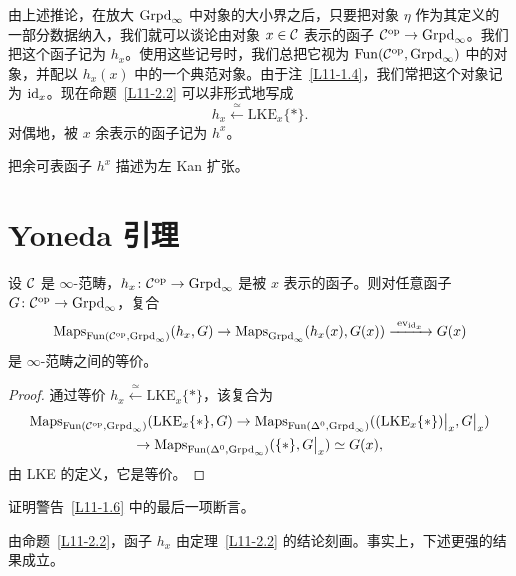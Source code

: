 \nitem\label{L11-2.5} 由上述推论，在放大 $\operatorname{Grpd}_\infty$ 中对象的大小界之后，只要把对象 $\eta$ 作为其定义的一部分数据纳入，我们就可以谈论由对象 $x\in\mathcal{C}$ 表示的函子 $\mathcal{C}^{\mathrm{op}}\to\operatorname{Grpd}_\infty$。我们把这个函子记为 $h_x$。使用这些记号时，我们总把它视为 $\operatorname{Fun}(\mathcal{C}^{\mathrm{op}},\operatorname{Grpd}_\infty)$ 中的对象，并配以 $h_x(x)$ 中的一个典范对象。由于注~\ref{L11-1.4}，我们常把这个对象记为 $\operatorname{id}_x$。现在命题~\ref{L11-2.2} 可以非形式地写成
\[
h_x\xleftarrow{\ \simeq\ }\mathrm{LKE}_x\{\ast\}.
\]
对偶地，被 $x$ 余表示的函子记为 $h^x$。

\begin{exercise}\label{L11-2.6}
把余可表函子 $h^x$ 描述为左 Kan 扩张。
\end{exercise}

\section{Yoneda 引理}

\begin{theorem}\label{L11-3.1}
设 $\mathcal{C}$ 是 $\infty$-范畴，$h_x\colon\mathcal{C}^{\mathrm{op}}\to\operatorname{Grpd}_\infty$ 是被 $x$ 表示的函子。则对任意函子 $G\colon\mathcal{C}^{\mathrm{op}}\to\operatorname{Grpd}_\infty$，复合
\[
\mathrm{Maps}_{\Fun(\cC^{\op},\Grpd_\infty)}(h_x,G)\to\mathrm{Maps}_{\Grpd_\infty}(h_x(x),G(x))\xrightarrow{\ \mathrm{ev}_{\id_x}\ }G(x)
\]
是 $\infty$-范畴之间的等价。
\end{theorem}

\begin{proof}
通过等价 $h_x\xleftarrow{\ \simeq\ }\mathrm{LKE}_x\{\ast\}$，该复合为
\begin{multline*}
\mathrm{Maps}_{\operatorname{Fun}(\mathcal{C}^{\mathrm{op}},\operatorname{Grpd}_\infty)}(\mathrm{LKE}_x\{\ast\},G)\to\mathrm{Maps}_{\operatorname{Fun}(\Delta^0,\operatorname{Grpd}_\infty)}((\mathrm{LKE}_x\{\ast\})\big|_{x},G\big|_{x})\\
\to\mathrm{Maps}_{\operatorname{Fun}(\Delta^0,\operatorname{Grpd}_\infty)}(\{\ast\},G\big|_{x})\simeq G(x),
\end{multline*}
由 LKE 的定义，它是等价。
\end{proof}

\begin{exercise}\label{L11-3.2}
证明警告~\ref{L11-1.6} 中的最后一项断言。
\end{exercise}

\nitem\label{L11-3.3} 由命题~\ref{L11-2.2}，函子 $h_x$ 由定理~\ref{L11-2.2} 的结论刻画。事实上，下述更强的结果成立。


